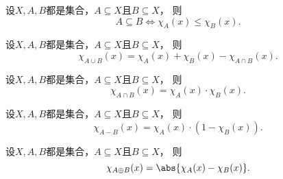 \begin{proposition}
设\(X,A,B\)都是集合，\(A \subseteq X\)且\(B \subseteq X\)，
则\[
	A \subseteq B
	\iff
	\chi_A(x) \leq \chi_B(x).
\]
\end{proposition}

\begin{proposition}
设\(X,A,B\)都是集合，\(A \subseteq X\)且\(B \subseteq X\)，
则\[
	\chi_{A \cup B}(x)
	= \chi_A(x) + \chi_B(x) - \chi_{A \cap B}(x).
\]
\end{proposition}

\begin{proposition}
设\(X,A,B\)都是集合，\(A \subseteq X\)且\(B \subseteq X\)，
则\[
	\chi_{A \cap B}(x)
	= \chi_A(x) \cdot \chi_B(x).
\]
\end{proposition}

\begin{proposition}
设\(X,A,B\)都是集合，\(A \subseteq X\)且\(B \subseteq X\)，
则\[
	\chi_{A - B}(x)
	= \chi_A(x) \cdot (1 - \chi_B(x)).
\]
\end{proposition}

\begin{proposition}
设\(X,A,B\)都是集合，\(A \subseteq X\)且\(B \subseteq X\)，
则\[
	\chi_{A \oplus B}(x)
	= \abs{\chi_A(x) - \chi_B(x)}.
\]
\end{proposition}


